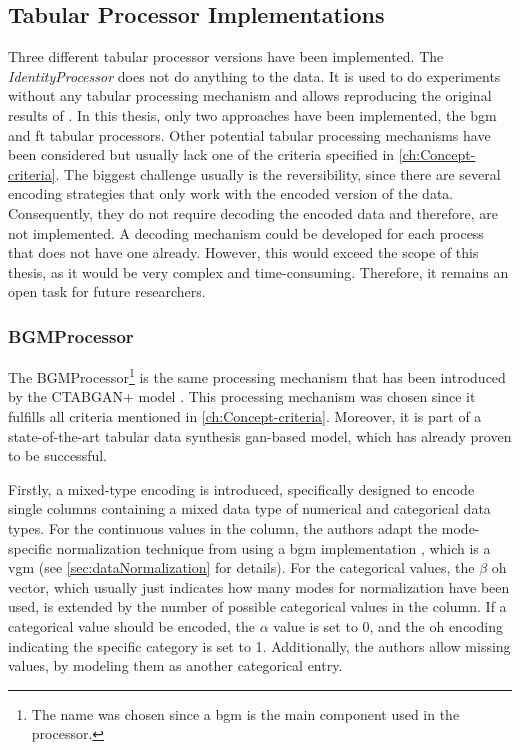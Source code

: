 \subsection{Tabular Processor Implementations}
\label{ch:architecture-tabularProcessor-implementations}

Three different tabular processor versions have been implemented.
The \textit{IdentityProcessor} does not do anything to the data.
It is used to do experiments without any tabular processing mechanism and allows reproducing the original results of \cite{kotelnikov2022TabDDPMModellingTabular}.
In this thesis, only two approaches have been implemented, the \gls{bgm} and \gls{ft} tabular processors.
Other potential tabular processing mechanisms have been considered but usually lack one of the criteria specified in \autoref{ch:Concept-criteria}.
The biggest challenge usually is the reversibility, since there are several encoding strategies that only work with the encoded version of the data.
Consequently, they do not require decoding the encoded data and therefore, are not implemented.
A decoding mechanism could be developed for each process that does not have one already.
However, this would exceed the scope of this thesis, as it would be very complex and time-consuming.
Therefore, it remains an open task for future researchers.

\subsubsection{BGMProcessor}
\label{ch:BGMProcessor}

The BGMProcessor\footnote{The name was chosen since a \acrfull{bgm} is the main component used in the processor.} is the same processing mechanism that has been introduced by the CTABGAN+ model \cite{zhao2022CTABGANEnhancingTabular}.
This processing mechanism was chosen since it fulfills all criteria mentioned in \autoref{ch:Concept-criteria}.
Moreover, it is part of a state-of-the-art tabular data synthesis \gls{gan}-based model, which has already proven to be successful.

Firstly, a mixed-type encoding is introduced, specifically designed to encode single columns containing a mixed data type of numerical and categorical data types.
For the continuous values in the column, the authors adapt the mode-specific normalization technique from \cite{xu2019ModelingTabularData} using a \gls{bgm} implementation \cite{scikit-learndevelopers2023BayesianGaussianMixture}, which is a \gls{vgm} (see \autoref{sec:dataNormalization} for details).
For the categorical values, the $\beta$ \gls{oh} vector, which usually just indicates how many modes for normalization have been used, is extended by the number of possible categorical values in the column.
If a categorical value should be encoded, the $\alpha$ value is set to 0, and the \gls{oh} encoding indicating the specific category is set to 1.
Additionally, the authors allow missing values, by modeling them as another categorical entry.


